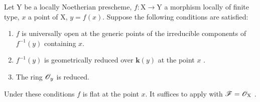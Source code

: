 \begin{corollary}[15.2.3]
\label{IV.15.2.3}
Let $\mathrm{Y}$ be a locally Noetherian prescheme, $f:\mathrm{X}\to\mathrm{Y}$ a morphism locally of finite type, $x$ a point of $\mathrm{X}$, $y=f(x)$.
Suppose the following conditions are satisfied:
\begin{enumerate}[label=(\roman*)]
  \item $f$ is universally open at the generic points of the irreducible components of $f^{-1}(y)$ containing $x$.
  \item $f^{-1}(y)$ is geometrically reduced over $\mathbf{k}(y)$ at the point $x$ .
  \item The ring $\mathscr{O}_y$ is reduced.
\end{enumerate}
Under these conditions $f$ is flat at the point $x$.
It suffices to apply  with $\mathscr{F}=\mathscr{O}_\mathrm{X}$ .
\end{corollary}

